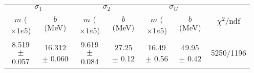 \begin{tabular}{cc|cc|cc||c}
\multicolumn{2}{c|}{$\sigma_1$} & \multicolumn{2}{|c}{$\sigma_2$} & \multicolumn{2}{|c}{$\sigma_G$}  & \multirow{2}{*}{$\chi^2/$ndf}\\
$m$ ($\times1e5$) & $b$ (MeV) & $m$ ($\times1e5$) & $b$ (MeV) & $m$ ($\times1e5$) & $b$ (MeV) & \\
\hline
8.519 $\pm$ 0.057 & 16.312 $\pm$ 0.060 & 9.619 $\pm$ 0.084 & 27.25 $\pm$ 0.12 & 16.49 $\pm$ 0.56 & 49.95 $\pm$ 0.42 & 5250/1196\\
\end{tabular}
